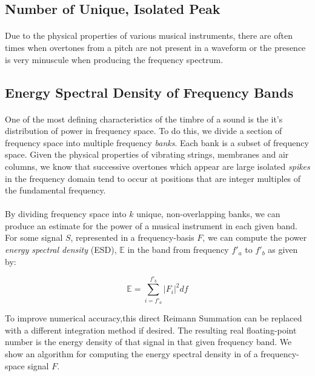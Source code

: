 \documentclass[12pt,letterpaper]{article}
\begin{document}

\subsection{Number of Unique, Isolated Peak}

\paragraph*{}Due to the physical properties of various musical instruments, there are often times when overtones from a pitch are not present in a waveform or the presence is very minuscule when producing the frequency spectrum.


\subsection{Energy Spectral Density of Frequency Bands}

\paragraph*{}One of the most defining characteristics of the timbre of a sound is the it's distribution of power in frequency space. To do this, we divide a section of frequency space into multiple frequency \textit{banks}. Each bank is a subset of frequency space. Given the physical properties of vibrating strings, membranes and air columns, we know that successive overtones which appear are large isolated \textit{spikes} in the frequency domain tend to occur at positions that are integer multiples of the fundamental frequency.

\paragraph*{}By dividing frequency space into $k$ unique, non-overlapping banks, we can produce an estimate for the power of a musical instrument in each given band. For some signal $S$, represented in a frequency-basis $F$, we can compute the power \textit{energy spectral density} (ESD), $\mathbb{E}$ in the band from frequency $f'_a$ to $f'_b$ as given by:

\begin{equation}
\mathbb{E} = \sum_{i=f'_a}^{f'_b} |F_i|^2 df
\end{equation}

To improve numerical accuracy,this direct Reimann Summation can be replaced with a different integration method if desired. The resulting real floating-point number is the energy density of that signal in that given frequency band. We show an algorithm for computing the energy spectral density in of a frequency-space signal $F$.
\end{document}
